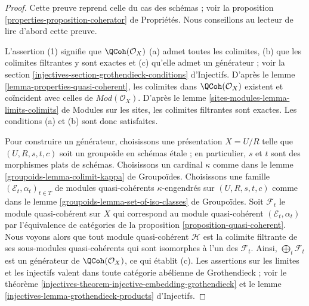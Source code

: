 \begin{proof}
Cette preuve reprend celle du cas des schémas ; voir la
proposition \ref{properties-proposition-coherator} de Propriétés.
Nous conseillons au lecteur de lire d'abord cette preuve.

\medskip\noindent
L'assertion (1) signifie que $\QCoh(\mathcal{O}_X)$ (a) admet toutes les colimites,
(b) que les colimites filtrantes y sont exactes et (c) qu'elle admet un générateur ; voir la
section \ref{injectives-section-grothendieck-conditions} d'Injectifs.
D'après le lemme \ref{lemma-properties-quasi-coherent},
les colimites dans $\QCoh(\mathcal{O}_X)$ existent et coïncident
avec celles de $\textit{Mod}(\mathcal{O}_X)$. D'après le
lemme \ref{sites-modules-lemma-limits-colimits} de Modules sur les sites,
les colimites filtrantes sont exactes. Les conditions (a) et (b) sont donc satisfaites.

\medskip\noindent
Pour construire un générateur, choisissons une présentation $X = U/R$ telle que
$(U, R, s, t, c)$ soit un
groupoïde en schémas \'etale ; en particulier, $s$ et $t$ sont des morphismes plats
de schémas. Choisissons un cardinal $\kappa$ comme dans le
lemme \ref{groupoids-lemma-colimit-kappa} de Groupoïdes.
Choisissons une famille $(\mathcal{E}_t, \alpha_t)_{t \in T}$ de
modules quasi-cohérents $\kappa$-engendrés sur
$(U, R, s, t, c)$ comme dans le
lemme \ref{groupoids-lemma-set-of-iso-classes} de Groupoïdes.
Soit $\mathcal{F}_t$ le module quasi-cohérent sur $X$ qui
correspond au module quasi-cohérent $(\mathcal{E}_t, \alpha_t)$ par
l'équivalence de catégories de la
proposition \ref{proposition-quasi-coherent}.
Nous voyons alors que tout module quasi-cohérent $\mathcal{H}$ est la
colimite filtrante de ses sous-modules quasi-cohérents qui sont isomorphes
à l'un des $\mathcal{F}_t$. Ainsi, $\bigoplus_t \mathcal{F}_t$ est
un générateur de $\QCoh(\mathcal{O}_X)$, ce qui établit (c).
Les assertions sur les limites et les injectifs valent dans toute catégorie
abélienne de Grothendieck ; voir le
théorème
\ref{injectives-theorem-injective-embedding-grothendieck} et le
lemme \ref{injectives-lemma-grothendieck-products} d'Injectifs.


\end{proof}
